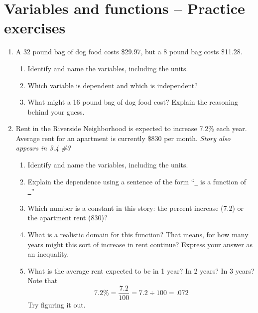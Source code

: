
\section{Variables and functions  -- Practice exercises}
\begin{enumerate}

\item A 32 pound bag of dog food costs \$29.97, but a 8 pound bag costs \$11.28.  
\begin{enumerate}
\item  Identify and name the variables, including the units. \vfill
\item Which variable is dependent and which is independent? \vfill
\item What might a 16 pound bag of dog food cost? Explain the reasoning behind your guess.  
\end{enumerate} %
 \vfill \vfill
 
\newpage %

\item Rent in the Riverside Neighborhood is expected to increase 7.2\% each year.  Average rent for an apartment is currently \$830 per month.  \hfill \emph{Story also appears in 3.4 \#3} 
\begin{enumerate}
\item Identify and name the variables, including the units. \vfill
\item Explain the dependence using a sentence of the form ``\underline{~\quad} is a function of \underline{~\quad}'' \bigskip
\item Which number is a constant in this story:  the percent increase (7.2) or the apartment rent (830)? \bigskip
\item What is a realistic domain for this function?  That means, for how many years might this sort of increase in rent continue?   Express your answer as an inequality. \vfill
\item What is the average rent expected to be in 1 year?  In 2 years?  In 3 years?  Note that $$7.2\% = \frac{7.2}{100} = 7.2 \div 100 = .072$$ Try figuring it out.   \vfill   \vfill
\end{enumerate}

\newpage %
 

\end{enumerate}
